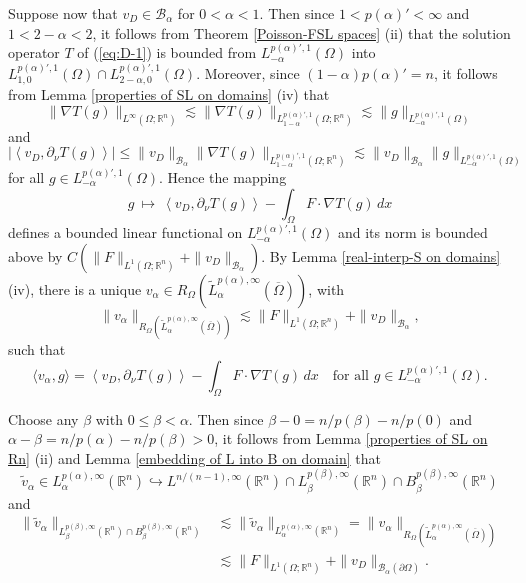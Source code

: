 \documentclass[reqno,centertags,11pt]{amsart}
\theoremstyle{definition}
\numberwithin{thm}{section}
\numberwithin{equation}{section}
\newcommand{\R}{{\mathbb{R}}}
\begin{document}
Suppose now  that $v_D \in \mathcal{B}_\alpha$ for $0< \alpha < 1$.
Then since   $1 < p(\alpha)' < \infty$ and $ 1< 2-\alpha < 2$, it follows from   Theorem \ref{Poisson-FSL spaces} (ii) that  the solution operator $T$ of (\ref{eq:D-1}) is bounded from $L_{-\alpha}^{p(\alpha)',1}(\Omega )$ into $L_{1,0}^{p(\alpha)',1} (\Omega ) \cap  L_{2-\alpha, 0}^{p(\alpha)' ,1}(\Omega )$.
Moreover, since $(1-\alpha )p(\alpha)' =n$, it follows from Lemma \ref{properties of SL on domains} (iv)  that
\[
\|\nabla T(g)\|_{L^\infty  (\Omega; \R^n )} \lesssim  \|\nabla T(g)\|_{L_{1-\alpha}^{p(\alpha)'  ,1} (\Omega ; \R^n)}\lesssim  \| g\|_{L_{-\alpha}^{p(\alpha)'  ,1} (\Omega )}
\]
and
\[
\left| \left\langle v_D ,   \partial_\nu T(g)   \right\rangle \right| \le \|v_D \|_{\mathcal{B}_\alpha}\|\nabla T(g)\|_{L_{1-\alpha}^{p(\alpha)'  ,1} (\Omega ; \R^n)}\lesssim \|v_D \|_{\mathcal{B}_\alpha}\| g\|_{L_{-\alpha}^{p(\alpha)'  ,1} (\Omega )}
\]
for all $g \in L_{-\alpha}^{p(\alpha)',1}(\Omega )$. Hence the mapping
\[
g \ \mapsto \ \left\langle v_D ,   \partial_\nu T(g)   \right\rangle - \int_\Omega F \cdot   \nabla T(g) \, d x
\]
defines a bounded linear functional on $ L_{-\alpha}^{p(\alpha)',1}(\Omega )$ and its norm is bounded above by $C \left( \|F \|_{L^1  (\Omega ;\R^n )}+ \|v_D \|_{\mathcal B_\alpha } \right)$.
By Lemma \ref{real-interp-S on domains} (iv), %
there is a unique
$v_\alpha \in R_\Omega  (\widetilde{L}_\alpha^{p(\alpha),\infty} (\overline{\Omega} ) )  $,
with
$$
\|v_\alpha \|_{R_\Omega  (\widetilde{L}_\alpha^{p(\alpha),\infty} (\overline{\Omega} ) )} \lesssim \|F \|_{L^1  (\Omega ;\R^n )}+ \|v_D \|_{\mathcal B_\alpha},
$$
 such that
\begin{equation}\label{function u-alpha}
 \langle v_\alpha , g  \rangle = \left\langle v_D ,   \partial_\nu T(g)   \right\rangle - \int_\Omega F \cdot   \nabla T(g) \, d x \quad\mbox{for all} \,\, g \in L_{-\alpha}^{p(\alpha)',1}(\Omega ).
\end{equation}


Choose any $\beta$ with   $0 \le  \beta <  \alpha $.
Then since $\beta-0  = n/p(\beta)-n/p (0)$ and $\alpha  -\beta  = n/p(\alpha)  - n/p(\beta) >0$, it follows from Lemma \ref{properties of SL on Rn} (ii) and   Lemma \ref{embedding of L into B on domain} that
$$
\widetilde{v}_\alpha \in L_\alpha^{p(\alpha),\infty} (\R^n  ) \hookrightarrow
{L}^{n/(n-1),\infty}(\R^n )\cap {L}_{\beta}^{p(\beta),\infty}(\R^n )\cap {B}_{\beta}^{p(\beta),\infty}(\R^n )
$$
and
\begin{align*}
\|\widetilde{v}_\alpha \|_{{L}_{\beta}^{p(\beta),\infty}(\R^n )\cap {B}_{\beta}^{p(\beta),\infty}(\R^n )} & \lesssim
\|\widetilde{v}_\alpha \|_{L_\alpha^{p(\alpha),\infty} (\R^n  )}= \|v_\alpha \|_{R_\Omega  (\widetilde{L}_\alpha^{p(\alpha),\infty} (\overline{\Omega} ) )}\\
&\lesssim \|F \|_{L^1  (\Omega ;\R^n )}+ \|v_D \|_{\mathcal B_\alpha (\partial\Omega )}.
\end{align*}
\end{document}
